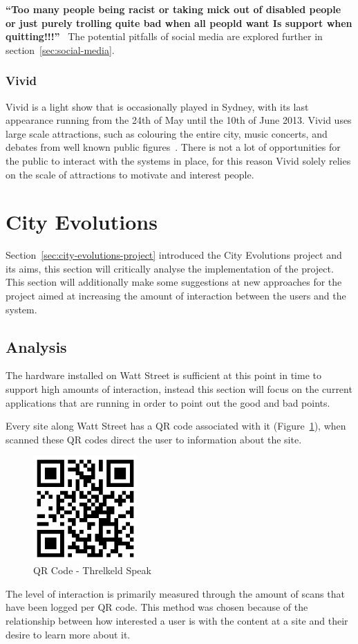 \documentclass[a4paper,12pt]{article}
\begin{document}
\indent\textbf{``Too many people being racist or taking mick out of disabled people or just purely trolling quite bad when all peopld want Is support when quitting!!!''}~\citep{quitnow}
The potential pitfalls of social media are explored further in section~\ref{sec:social-media}.

\subsubsection{Vivid}
Vivid is a light show that is occasionally played in Sydney, with its last appearance running from the 24th of May until the 10th of June 2013.
Vivid uses large scale attractions, such as colouring the entire city, music concerts, and debates from well known public figures~\citep{vivid}. 
There is not a lot of opportunities for the public to interact with the systems in place, for this reason Vivid solely relies on the scale of attractions to motivate and interest people.

\section{City Evolutions}
Section~\ref{sec:city-evolutions-project} introduced the City Evolutions project and its aims, this section will critically analyse the implementation of the project.
This section will additionally make some suggestions at new approaches for the project aimed at increasing the amount of interaction between the users and the system.

\subsection{Analysis}\label{sec:analysis}
The hardware installed on Watt Street is sufficient at this point in time to support high amounts of interaction, instead this section will focus on the current applications that are running in order to point out the good and bad points. 

\par
Every site along Watt Street has a QR code associated with it (Figure~\ref{QR-threkeld-barcode}), when scanned these QR codes direct the user to information about the site. 
\begin{figure}[ht!]
	\centering
	\includegraphics[width=40mm]{./images/qrcode-threlkeld}
	\caption{QR Code - Threlkeld Speak}
	\label{QR-threkeld-barcode}
\end{figure}
The level of interaction is primarily measured through the amount of scans that have been logged per QR code. 
This method was chosen because of the relationship between how interested a user is with the content at a site and their desire to learn more about it.
\end{document}
